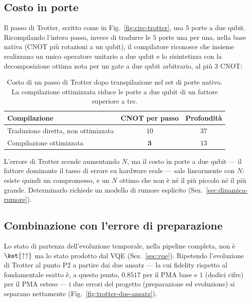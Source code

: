 \documentclass[11pt,a4paper]{article}
\begin{document}
\subsection{Costo in porte}

Il passo di Trotter, scritto come in Fig.~\ref{fig:circ-trotter}, usa $5$
porte a due qubit. Ricompilando l'intero passo, invece di tradurre le $5$
porte una per una, nella base nativa (CNOT più rotazioni a un qubit), il
compilatore riconosce che insieme realizzano un unico operatore unitario a
due qubit e lo risintetizza con la decomposizione ottima nota per un gate
a due qubit arbitrario, al più $3$ CNOT:

\begin{table}[htbp]
\centering
\renewcommand{\arraystretch}{1.25}
\begin{tabular}{@{}lcc@{}}
\toprule
Compilazione & CNOT per passo & Profondità \\
\midrule
Traduzione diretta, non ottimizzata & $10$ & $37$ \\
Compilazione ottimizzata & $\mathbf{3}$ & $13$ \\
\bottomrule
\end{tabular}
\caption{Costo di un passo di Trotter dopo transpilazione nel set di porte
nativo. La compilazione ottimizzata riduce le porte a due qubit di un
fattore superiore a tre.}
\label{tab:costo-trotter}
\end{table}
\FloatBarrier

L'errore di Trotter scende aumentando $N$, ma il costo in porte a due
qubit --- il fattore dominante il tasso di errore su hardware reale ---
sale linearmente con $N$: esiste quindi un compromesso, e un $N$ ottimo
che non è né il più piccolo né il più grande. Determinarlo richiede un
modello di rumore esplicito (Sez.~\ref{sec:dinamica-rumore}).

\subsection{Combinazione con l'errore di preparazione}

Lo stato di partenza dell'evoluzione temporale, nella pipeline completa,
non è $\ket{\uparrow\uparrow}$ ma lo stato prodotto dal VQE
(Sez.~\ref{sec:vqe}). Ripetendo l'evoluzione di Trotter al punto P2 a
partire dai due ansatz --- la cui fidelity rispetto al fondamentale esatto
è, a questo punto, $0.8517$ per il PMA base e $1$ (dodici cifre) per il
PMA esteso --- i due errori del progetto (preparazione ed evoluzione) si
separano nettamente (Fig.~\ref{fig:trotter-due-ansatz}).
\end{document}
